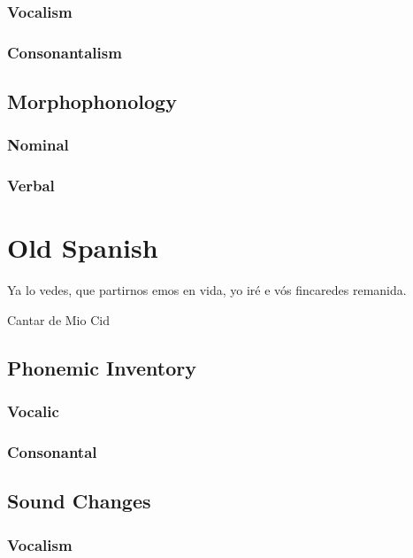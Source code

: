 \documentclass{report}
\begin{document}
\subsection{Vocalism}

\subsection{Consonantalism}

\section{Morphophonology}

\subsection{Nominal}

\subsection{Verbal}

\chapter{Old Spanish}

\epigraph{Ya lo vedes, que partirnos emos en vida, yo iré e vós fincaredes remanida.}{Cantar de Mio Cid}

\section{Phonemic Inventory}

\subsection{Vocalic}

\subsection{Consonantal}

\section{Sound Changes}

\subsection{Vocalism}
\end{document}
